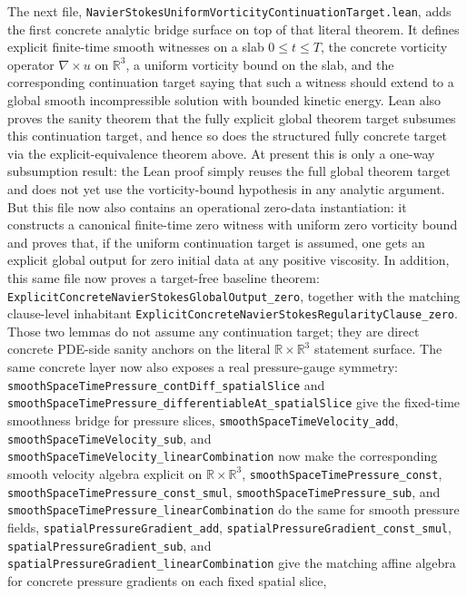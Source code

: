 \documentclass[11pt]{article}
\begin{document}
The next file, \texttt{NavierStokesUniformVorticityContinuationTarget.lean},
adds the first concrete analytic bridge surface on top of that literal theorem.
It defines explicit finite-time smooth witnesses on a slab \(0 \le t \le T\),
the concrete vorticity operator \(\nabla \times u\) on \(\mathbb{R}^3\), a
uniform vorticity bound on the slab, and the corresponding continuation target
saying that such a witness should extend to a global smooth incompressible
solution with bounded kinetic energy.  Lean also proves the sanity theorem that
the fully explicit global theorem target subsumes this continuation target, and
hence so does the structured fully concrete target via the explicit-equivalence
theorem above.  At present this is only a one-way subsumption result: the Lean
proof simply reuses the full global theorem target and does not yet use the
vorticity-bound hypothesis in any analytic argument.  But this file now also
contains an operational zero-data instantiation: it constructs a canonical
finite-time zero witness with uniform zero vorticity bound and proves that, if
the uniform continuation target is assumed, one gets an explicit global output
for zero initial data at any positive viscosity.  In addition, this same file
now proves a target-free baseline theorem:
\texttt{ExplicitConcreteNavierStokesGlobalOutput\_zero}, together with the
matching clause-level inhabitant
\texttt{ExplicitConcreteNavierStokesRegularityClause\_zero}.  Those two lemmas
do not assume any continuation target; they are direct concrete PDE-side sanity
anchors on the literal \(\mathbb{R} \times \mathbb{R}^3\) statement surface.
The same concrete layer now also exposes a real pressure-gauge symmetry:
\texttt{smoothSpaceTimePressure\_contDiff\_spatialSlice} and
\texttt{smoothSpaceTimePressure\_differentiableAt\_spatialSlice} give the
fixed-time smoothness bridge for pressure slices,
\texttt{smoothSpaceTimeVelocity\_add},
\texttt{smoothSpaceTimeVelocity\_sub}, and
\texttt{smoothSpaceTimeVelocity\_linearCombination} now make the corresponding
smooth velocity algebra explicit on \(\mathbb{R} \times \mathbb{R}^3\),
\texttt{smoothSpaceTimePressure\_const},
\texttt{smoothSpaceTimePressure\_const\_smul},
\texttt{smoothSpaceTimePressure\_sub}, and
\texttt{smoothSpaceTimePressure\_linearCombination} do the same for smooth
pressure fields,
\texttt{spatialPressureGradient\_add},
\texttt{spatialPressureGradient\_const\_smul},
\texttt{spatialPressureGradient\_sub}, and
\texttt{spatialPressureGradient\_linearCombination} give the matching affine
algebra for concrete pressure gradients on each fixed spatial slice,
\end{document}
